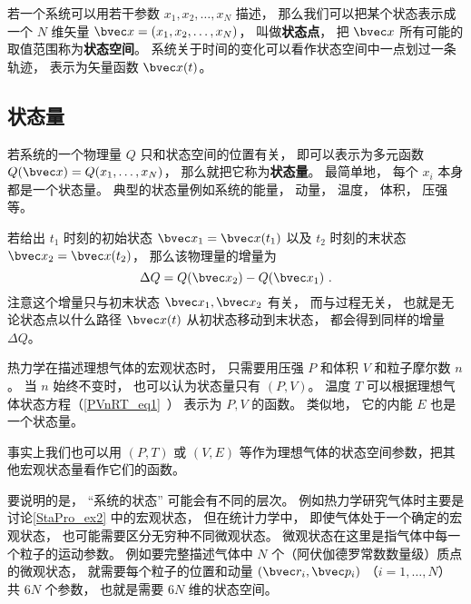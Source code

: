 

若一个系统可以用若干参数 $x_1, x_2,  \dots, x_N$ 描述， 那么我们可以把某个状态表示成一个 $N$ 维矢量 $\bvec x = (x_1, x_2, \dots, x_N)$， 叫做\textbf{状态点}， 把 $\bvec x$ 所有可能的取值范围称为\textbf{状态空间}。 系统关于时间的变化可以看作状态空间中一点划过一条轨迹， 表示为矢量函数 $\bvec x(t)$。

\subsection{状态量}
若系统的一个物理量 $Q$ 只和状态空间的位置有关， 即可以表示为多元函数 $Q(\bvec x) = Q(x_1, \dots, x_N)$， 那么就把它称为\textbf{状态量}。 最简单地， 每个 $x_i$ 本身都是一个状态量。 典型的状态量例如系统的能量， 动量， 温度， 体积， 压强等。

若给出 $t_1$ 时刻的初始状态 $\bvec x_1 = \bvec x(t_1)$ 以及 $t_2$ 时刻的末状态 $\bvec x_2 = \bvec x(t_2)$， 那么该物理量的增量为
\begin{equation}
\Delta Q = Q(\bvec x_2) - Q(\bvec x_1)~.
\end{equation}
注意这个增量只与初末状态 $\bvec x_1,\bvec x_2$ 有关， 而与过程无关， 也就是无论状态点以什么路径 $\bvec x(t)$ 从初状态移动到末状态， 都会得到同样的增量 $\Delta Q$。

\begin{example}{}\label{StaPro_ex2}
热力学在描述理想气体的宏观状态时， 只需要用压强 $P$ 和体积 $V$ 和粒子摩尔数 $n$。 当 $n$ 始终不变时， 也可以认为状态量只有 $(P,V)$。 温度 $T$ 可以根据理想气体状态方程（\autoref{PVnRT_eq1}~） 表示为 $P,V$ 的函数。 类似地， 它的内能 $E$ 也是一个状态量。

事实上我们也可以用 $(P,T)$ 或 $(V,E)$ 等作为理想气体的状态空间参数，把其他宏观状态量看作它们的函数。
\end{example}

要说明的是， “系统的状态” 可能会有不同的层次。 例如热力学研究气体时主要是讨论\autoref{StaPro_ex2} 中的宏观状态， 但在统计力学中， 即使气体处于一个确定的宏观状态， 也可能需要区分无穷种不同微观状态。 微观状态在这里是指气体中每一个粒子的运动参数。 例如要完整描述气体中 $N$ 个（阿伏伽德罗常数数量级）质点的微观状态， 就需要每个粒子的位置和动量 $(\bvec r_i, \bvec p_i)$ （$i=1,\dots,N$） 共 $6N$ 个参数， 也就是需要 $6N$ 维的状态空间。

